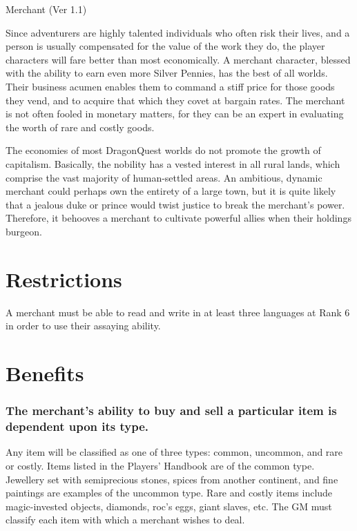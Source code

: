 \begin{Chapter}{Merchant (Ver 1.1)}

Since adventurers are highly talented individuals who often risk their
lives, and a person is usually compensated for the value of the work
they do, the player characters will fare better than most
economically.  A merchant character, blessed with the ability to earn
even more Silver Pennies, has the best of all worlds.  Their business
acumen enables them to command a stiff price for those goods they
vend, and to acquire that which they covet at bargain rates.  The
merchant is not often fooled in monetary matters, for they can be an
expert in evaluating the worth of rare and costly goods.

The economies of most DragonQuest worlds do not promote the growth of
capitalism.  Basically, the nobility has a vested interest in all
rural lands, which comprise the vast majority of human-settled areas.
An ambitious, dynamic merchant could perhaps own the entirety of a
large town, but it is quite likely that a jealous duke or prince would
twist justice to break the merchant’s power. Therefore, it behooves a
merchant to cultivate powerful allies when their holdings burgeon.

\section{Restrictions}

A merchant must be able to read and write in at least three languages
at Rank 6 in order to use their assaying ability.

\section{Benefits}

\subsubsection{The merchant’s ability to buy and sell a particular item is dependent
upon its type.}

Any item will be classified as one of three types: common, uncommon,
and rare or costly.  Items listed in the Players’ Handbook are of the
common type. Jewellery set with semiprecious stones, spices from
another continent, and fine paintings are examples of the uncommon
type.  Rare and costly items include magic-invested objects, diamonds,
roc’s eggs, giant slaves, etc. The GM must classify each item with
which a merchant wishes to deal.


\end{Chapter}
